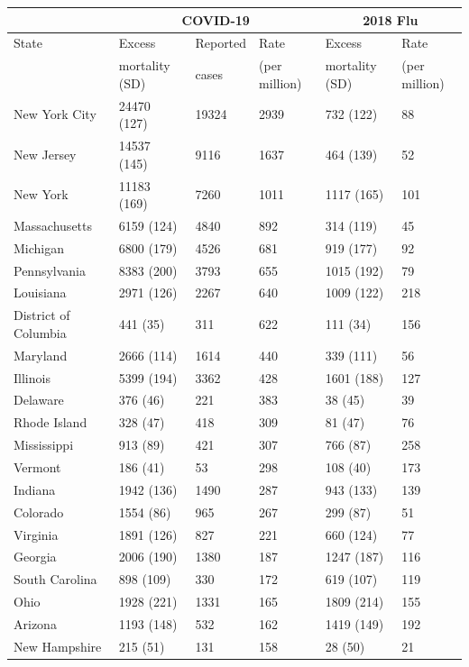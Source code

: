 \documentclass[11pt]{article}
\begin{document}
\begin{table}
\centering
\small
\begin{tabular}{|l|lll|ll|}
  \hline
 & \multicolumn{3}{c|}{COVID-19} & \multicolumn{2}{c|}{2018 Flu} \\
\hline
State & Excess & Reported & Rate  & Excess & Rate \\
 & mortality (SD) & cases & (per million) & mortality (SD) & (per million) \\
\hline
New York City & 24470 (127) & 19324 & 2939 & 732 (122) & 88 \\ 
  New Jersey & 14537 (145) & 9116 & 1637 & 464 (139) & 52 \\ 
  New York& 11183 (169) & 7260 & 1011 & 1117 (165) & 101 \\ 
  Massachusetts & 6159 (124) & 4840 & 892 & 314 (119) & 45 \\ 
  Michigan & 6800 (179) & 4526 & 681 & 919 (177) & 92 \\ 
  Pennsylvania & 8383 (200) & 3793 & 655 & 1015 (192) & 79 \\ 
  Louisiana & 2971 (126) & 2267 & 640 & 1009 (122) & 218 \\ 
  District of Columbia & 441 (35) & 311 & 622 & 111 (34) & 156 \\ 
  Maryland & 2666 (114) & 1614 & 440 & 339 (111) & 56 \\ 
  Illinois & 5399 (194) & 3362 & 428 & 1601 (188) & 127 \\ 
  Delaware & 376 (46) & 221 & 383 & 38 (45) & 39 \\ 
  Rhode Island & 328 (47) & 418 & 309 & 81 (47) & 76 \\ 
  Mississippi & 913 (89) & 421 & 307 & 766 (87) & 258 \\ 
  Vermont & 186 (41) & 53 & 298 & 108 (40) & 173 \\ 
  Indiana & 1942 (136) & 1490 & 287 & 943 (133) & 139 \\ 
  Colorado & 1554 (86) & 965 & 267 & 299 (87) & 51 \\ 
  Virginia & 1891 (126) & 827 & 221 & 660 (124) & 77 \\ 
  Georgia & 2006 (190) & 1380 & 187 & 1247 (187) & 116 \\ 
  South Carolina & 898 (109) & 330 & 172 & 619 (107) & 119 \\ 
  Ohio & 1928 (221) & 1331 & 165 & 1809 (214) & 155 \\ 
  Arizona & 1193 (148) & 532 & 162 & 1419 (149) & 192 \\ 
  New Hampshire & 215 (51) & 131 & 158 & 28 (50) & 21 \\ 

\end{tabular}
\end{table}
\end{document}
